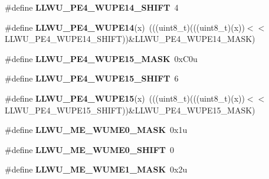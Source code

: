 \begin{DoxyCompactItemize}
\#define {\bfseries L\+L\+W\+U\+\_\+\+P\+E4\+\_\+\+W\+U\+P\+E14\+\_\+\+S\+H\+I\+FT}~4
\item 
\mbox{\label{group___l_l_w_u___register___masks_ga376a97009729f8dde435a783deb148d8}} 
\#define {\bfseries L\+L\+W\+U\+\_\+\+P\+E4\+\_\+\+W\+U\+P\+E14}(x)~(((uint8\+\_\+t)(((uint8\+\_\+t)(x))$<$$<$L\+L\+W\+U\+\_\+\+P\+E4\+\_\+\+W\+U\+P\+E14\+\_\+\+S\+H\+I\+FT))\&L\+L\+W\+U\+\_\+\+P\+E4\+\_\+\+W\+U\+P\+E14\+\_\+\+M\+A\+SK)
\item 
\mbox{\label{group___l_l_w_u___register___masks_ga53e48ffd153996ab89adb3c4df7511ee}} 
\#define {\bfseries L\+L\+W\+U\+\_\+\+P\+E4\+\_\+\+W\+U\+P\+E15\+\_\+\+M\+A\+SK}~0x\+C0u
\item 
\mbox{\label{group___l_l_w_u___register___masks_gaeaf1e05b8de75133c46d6f11b3346732}} 
\#define {\bfseries L\+L\+W\+U\+\_\+\+P\+E4\+\_\+\+W\+U\+P\+E15\+\_\+\+S\+H\+I\+FT}~6
\item 
\mbox{\label{group___l_l_w_u___register___masks_gadd015539f974ee2820707b9abf3787ba}} 
\#define {\bfseries L\+L\+W\+U\+\_\+\+P\+E4\+\_\+\+W\+U\+P\+E15}(x)~(((uint8\+\_\+t)(((uint8\+\_\+t)(x))$<$$<$L\+L\+W\+U\+\_\+\+P\+E4\+\_\+\+W\+U\+P\+E15\+\_\+\+S\+H\+I\+FT))\&L\+L\+W\+U\+\_\+\+P\+E4\+\_\+\+W\+U\+P\+E15\+\_\+\+M\+A\+SK)
\item 
\mbox{\label{group___l_l_w_u___register___masks_ga5f1588218d510ac13093055708ceae49}} 
\#define {\bfseries L\+L\+W\+U\+\_\+\+M\+E\+\_\+\+W\+U\+M\+E0\+\_\+\+M\+A\+SK}~0x1u
\item 
\mbox{\label{group___l_l_w_u___register___masks_ga7f653f4ce89c4512437c0114f4659502}} 
\#define {\bfseries L\+L\+W\+U\+\_\+\+M\+E\+\_\+\+W\+U\+M\+E0\+\_\+\+S\+H\+I\+FT}~0
\item 
\mbox{\label{group___l_l_w_u___register___masks_ga99b29643134140d21a3d4259b7f64c86}} 
\#define {\bfseries L\+L\+W\+U\+\_\+\+M\+E\+\_\+\+W\+U\+M\+E1\+\_\+\+M\+A\+SK}~0x2u
\item 
\mbox{\label{group___l_l_w_u___register___masks_gac623d0db3076972370ee795830b555c1}} 

\end{DoxyCompactItemize}
